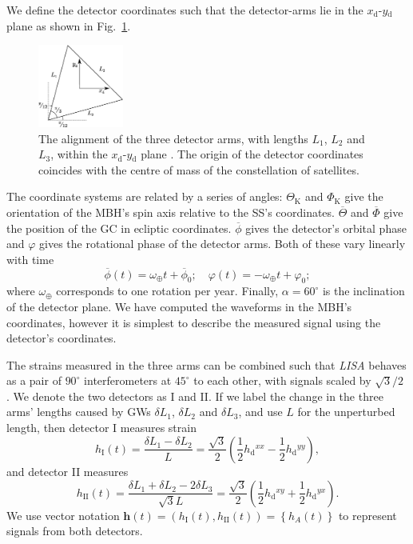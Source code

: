\documentclass[useAMS,usedcolumn,usegraphicx,usenatbib]{mn2e}
\newcommand{\figref}[1]{Fig.~\ref{fig:#1}}
\newcommand{\sub}[1]{\ensuremath{_\mathrm{#1}}}
\newcommand{\recip}[1]{\ensuremath{\frac{1}{#1}}}
\begin{document}
We define the detector coordinates such that the detector-arms lie in the $x\sub{d}$-$y\sub{d}$ plane as shown in \figref{LISA_arms}.
\begin{figure}
\begin{center}
 \includegraphics[width=0.25\textwidth]{LISA_arms.eps}
    \caption{The alignment of the three detector arms, with lengths $L_1$, $L_2$ and $L_3$, within the $x\sub{d}$-$y\sub{d}$ plane \citep{Cutler1998}. The origin of the detector coordinates coincides with the centre of mass of the constellation of satellites.}
   \label{fig:LISA_arms}
\end{center}
\end{figure}
The coordinate systems are related by a series of angles: $\Theta\sub{K}$ and $\Phi\sub{K}$ give the orientation of the MBH's spin axis relative to the SS's coordinates. $\overline{\Theta}$ and $\overline{\Phi}$ give the position of the GC in ecliptic coordinates. $\overline{\phi}$ gives the detector's orbital phase and $\varphi$ gives the rotational phase of the detector arms. Both of these vary linearly with time
\begin{equation}
\overline{\phi}(t) = \omega_\oplus t + \overline{\phi}_0; \quad \varphi(t) = -\omega_\oplus t + \varphi_0;
\end{equation}
where $\omega_\oplus$ corresponds to one rotation per year. Finally, $\alpha = 60^{\circ}$ is the inclination of the detector plane. We have computed the waveforms in the MBH's coordinates, however it is simplest to describe the measured signal using the detector's coordinates.

The strains measured in the three arms can be combined such that \textit{LISA} behaves as a pair of $90^{\circ}$ interferometers at $45^{\circ}$ to each other, with signals scaled by ${\sqrt{3}}/{2}$ \citep{Cutler1998}. We denote the two detectors as I and II. If we label the change in the three arms' lengths caused by GWs $\delta L_1$, $\delta L_2$ and $\delta L_3$, and use $L$ for the unperturbed length, then detector I measures strain
\begin{equation}
h\sub{I}(t) = \frac{\delta L_1 - \delta L_2}{L} = \frac{\sqrt{3}}{2}\left(\recip{2} h\sub{d}^{xx} - \recip{2}h\sub{d}^{yy}\right),
\end{equation}
and detector II measures
\begin{equation}
h\sub{II}(t) = \frac{\delta L_1 + \delta L_2 - 2 \delta L_3}{\sqrt{3}L} = \frac{\sqrt{3}}{2}\left(\recip{2} h\sub{d}^{xy} + \recip{2} h\sub{d}^{yx}\right).
\end{equation}
We use vector notation $\boldsymbol{h}(t) = \left(h\sub{I}(t), h\sub{II}(t)\right) = \left\{h_A(t)\right\}$ to represent signals from both detectors.
\end{document}
